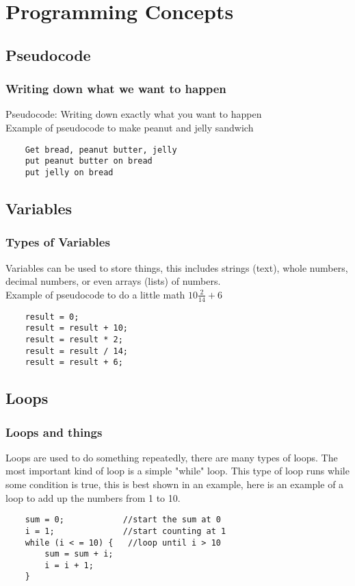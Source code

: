 \documentclass{beamer}
\begin{document}
\section{Programming Concepts}

\subsection{Pseudocode}

\begin{frame}[fragile]
	\frametitle{Writing down what we want to happen}
	Pseudocode: Writing down exactly what you want to happen \\
	Example of pseudocode to make peanut and jelly sandwich
	\begin{lstlisting}
	Get bread, peanut butter, jelly
	put peanut butter on bread
	put jelly on bread
	\end{lstlisting}
\end{frame}

\subsection{Variables}

\begin{frame}[fragile]
	\frametitle{Types of Variables}
	Variables can be used to store things, this includes strings (text), 
	whole numbers, decimal numbers, or even arrays (lists) of numbers. \\
	Example of pseudocode to do a little math $10 \frac {2}{14}+6$
	\begin{lstlisting}
	result = 0;
	result = result + 10;
	result = result * 2;
	result = result / 14;
	result = result + 6;
	\end{lstlisting}
\end{frame}

\subsection{Loops}
\begin{frame}[fragile]
	\frametitle{Loops and things}
	Loops are used to do something repeatedly, there are many types of loops.
	The most important kind of loop is a simple "while" loop. This type of
	loop runs while some condition is true, this is best shown in an example,
	here is an example of a loop to add up the numbers from 1 to 10.
	\begin{lstlisting}
	sum = 0;            //start the sum at 0
	i = 1;              //start counting at 1
	while (i < = 10) {   //loop until i > 10
	    sum = sum + i;
	    i = i + 1;
	}
	\end{lstlisting}
\end{frame}
\end{document}
